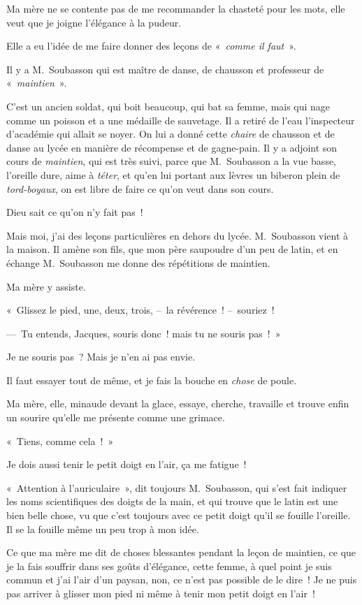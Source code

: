 \documentclass[french,twoside]{book} %
\begin{document}
\noindent Ma mère ne se contente pas de me recommander la chasteté pour les mots, elle veut que je joigne l’élégance à la pudeur.\par
Elle a eu l’idée de me faire donner des leçons de « \emph{comme il faut} ».\par
Il y a M. Soubasson qui est maître de danse, de chausson et professeur de « \emph{maintien} ».\par
C’est un ancien soldat, qui boit beaucoup, qui bat sa femme, mais qui nage comme un poisson et a une médaille de sauvetage. Il a retiré de l’eau l’inspecteur d’académie qui allait se noyer. On lui a donné cette\emph{ chaire} de chausson et de danse au lycée en manière de récompense et de gagne-pain. Il y a adjoint son cours de \emph{maintien}, qui est très suivi, parce que M. Soubasson a la vue basse, l’oreille dure, aime à \emph{téter}, et qu’en lui portant aux lèvres un biberon plein de \emph{tord-boyaux}, on est libre de faire ce qu’on veut dans son cours.\par
Dieu sait ce qu’on n’y fait pas !\par
Mais moi, j’ai des leçons particulières en dehors du lycée. M. Soubasson vient à la maison. Il amène son fils, que mon père saupoudre d’un peu de latin, et en échange M. Soubasson me donne des répétitions de maintien.\par
Ma mère y assiste.\par
« Glissez le pied, une, deux, trois, – la révérence ! – souriez !\par
— Tu entends, Jacques, souris donc ! mais tu ne souris pas ! »\par
Je ne souris pas ? Mais je n’en ai pas envie.\par
Il faut essayer tout de même, et je fais la bouche en \emph{chose} de poule.\par
Ma mère, elle, minaude devant la glace, essaye, cherche, travaille et trouve enfin un sourire qu’elle me présente comme une grimace.\par
« Tiens, comme cela ! »\par
Je dois aussi tenir le petit doigt en l’air, ça me fatigue !\par
« Attention à l’auriculaire », dit toujours M. Soubasson, qui s’est fait indiquer les noms scientifiques des doigts de la main, et qui trouve que le latin est une bien belle chose, vu que c’est toujours avec ce petit doigt qu’il se fouille l’oreille. Il se la fouille même un peu trop à mon idée.\par
\bigbreak
\noindent Ce que ma mère me dit de choses blessantes pendant la leçon de maintien, ce que je la fais souffrir dans ses goûts d’élégance, cette femme, à quel point je suis commun et j’ai l’air d’un paysan, non, ce n’est pas possible de le dire ! Je ne puis pas arriver à glisser mon pied ni même à tenir mon petit doigt en l’air !\par
\end{document}
